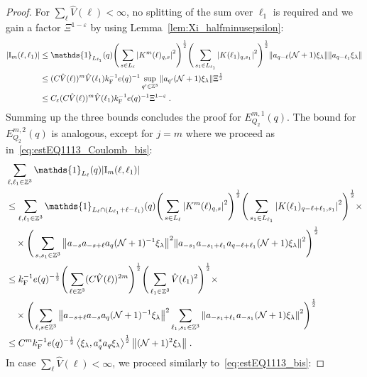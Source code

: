\documentclass[12pt,a4paper]{article}
\numberwithin{equation}{section}
\newcommand{\1}{\mathbb{I}}
\newcommand{\F}{\mathrm{F}}
\newcommand{\I}{\mathrm{I}}
\newcommand{\kF}{k_\F}
\newcommand{\Zstar}{\mathbb{Z}^3} %
\newcommand{\Z}{\mathbb{Z}}
\newcommand{\NN}{\mathcal{N}}
\newcommand{\half}{\frac{1}{2}}
\newcommand{\eva}[1]{\left\langle #1 \right\rangle}
\theoremstyle{plain}
\theoremstyle{definition}
\theoremstyle{remark}
\theoremstyle{plain}
\theoremstyle{definition}
\theoremstyle{remark}
\begin{document}
\begin{proof}
For $ \sum_\ell \hat{V}(\ell) < \infty $, no splitting of the sum over $ \ell_1 $ is required and we gain a factor $ \Xi^{1-\varepsilon} $ by using Lemma~\ref{lem:Xi_halfminusepsilon}:
\begin{align}
	|\I_m(\ell, \ell_1)|
	&\leq \mathds{1}_{L_{\ell_1}}(q) \Bigg(\sum_{s \in L_{\ell}} \abs{K^m(\ell)_{q,s}}^2\Bigg)^\half
		\Bigg(\sum_{s_1 \in L_{\ell_1}} \abs{K(\ell_1)_{q,s_1}}^2\Bigg)^\half
		\norm{ a_{q-\ell} (\NN+1) \xi_\lambda}
		\norm{ a_{q-\ell_1} \xi_\lambda }\nonumber\\
	&\leq (C \hat{V}(\ell))^m \hat{V}(\ell_1) \kF^{-1} e(q)^{-1}
		\sup_{q' \in \Z^3} \norm{ a_{q'} (\NN+1) \xi_\lambda }\Xi^{\half} \nonumber\\
	&\leq C_\varepsilon (C \hat{V}(\ell))^m
		\hat{V}(\ell_1)
		\kF^{-1} e(q)^{-1} \Xi^{1-\varepsilon} \;. \label{eq:estEQ2113}
\end{align}
Summing up the three bounds concludes the proof for $ E^{m,1}_{Q_2}(q) $.
%
The bound for $ E^{m,2}_{Q_2}(q) $ is analogous, except for $ j = m $ where we proceed as in~\eqref{eq:estEQ1113_Coulomb_bis}:
\begin{align}
	&\sum_{\ell,\ell_1 \in \Zstar} \mathds{1}_{L_\ell}(q) |\I_m(\ell, \ell_1)| \nonumber\\
	&\leq \sum_{\ell,\ell_1 \in \Zstar} \mathds{1}_{L_\ell \cap (L_{\ell_1}+\ell-\ell_1) }(q)
		\Bigg(\sum\limits_{s \in L_{\ell}} \abs{K^m(\ell)_{q,s}}^2\Bigg)^\half
		\Bigg(\sum\limits_{s_1 \in L_{\ell_1}} \abs{K(\ell_1)_{q-\ell+\ell_1,s_1}}^2\Bigg)^\half \times \nonumber\\
	&\quad \times \Bigg( \sum_{s,s_1 \in \Z^3} \norm{ a_{-s} a_{-s+\ell} a_q (\NN+1)^{-1} \xi_\lambda}^2
		\norm{ a_{-s_1} a_{-s_1+\ell_1} a_{q-\ell+\ell_1} (\NN+1) \xi_\lambda }^2 \Bigg)^{\half} \nonumber\\
	&\leq \kF^{-1} e(q)^{-\frac 12}
		\Bigg(\sum_{\ell \in \Zstar} (C \hat{V}(\ell))^{2m} \Bigg)^\half
		\Bigg(\sum_{\ell_1 \in \Zstar} \hat{V}(\ell_1)^2 \Bigg)^\half \times \nonumber\\
	&\quad \times \Bigg( \sum_{\ell,s \in \Z^3} \norm{a_{-s+\ell} a_{-s} a_q (\NN+1)^{-1} \xi_\lambda}^2
		\sum_{\ell_1,s_1 \in \Z^3} \norm{a_{-s_1+\ell_1} a_{-s_1} (\NN+1) \xi_\lambda }^2 \Bigg)^{\half} \nonumber\\
	&\leq C^m \kF^{-1} e(q)^{-\frac 12} \eva{\xi_\lambda, a_q^* a_q \xi_\lambda}^{\half} \norm{ (\NN+1)^2 \xi_\lambda } \;. \label{eq:estEQ2113_Coulomb_bis}
\end{align}
In case $ \sum_\ell \hat{V}(\ell) < \infty $, we proceed similarly to~\eqref{eq:estEQ1113_bis}:

\end{proof}
\end{document}

